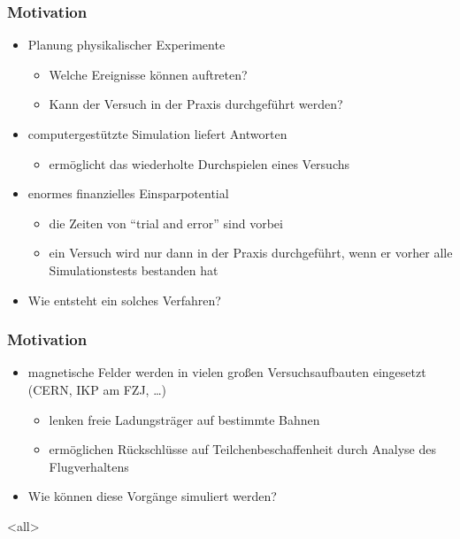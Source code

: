 \mode*
\begin{frame}
  \frametitle{Motivation}
  \begin{itemize}
    \item Planung physikalischer Experimente
    \begin{itemize}
      \item Welche Ereignisse k\"onnen auftreten?
      \item Kann der Versuch in der Praxis durchgef\"uhrt werden?
    \end{itemize}
    \item computergest\"utzte Simulation liefert Antworten
      \begin{itemize}
        \item erm\"oglicht das wiederholte Durchspielen eines Versuchs
      \end{itemize}
    \item enormes finanzielles Einsparpotential
      \begin{itemize}
        \item die Zeiten von "`trial and error"' sind vorbei
        \item ein Versuch wird nur dann in der Praxis durchgef\"uhrt,
          wenn er vorher alle Simulationstests bestanden hat
      \end{itemize}
    \item Wie entsteht ein solches Verfahren?
  \end{itemize}
\end{frame}

\begin{frame}
  \frametitle{Motivation}
  \begin{itemize}
    \item magnetische Felder werden in vielen gro{\ss}en
      Versuchsaufbauten eingesetzt (CERN, IKP am FZJ, \ldots)
    \begin{itemize}
      \item lenken freie Ladungstr\"ager auf bestimmte Bahnen
      \item erm\"oglichen R\"uckschl\"usse auf Teilchenbeschaffenheit
        durch Analyse des Flugverhaltens
    \end{itemize}
    \item Wie k\"onnen diese Vorg\"ange simuliert werden?
  \end{itemize}
\end{frame}
\mode<all>

